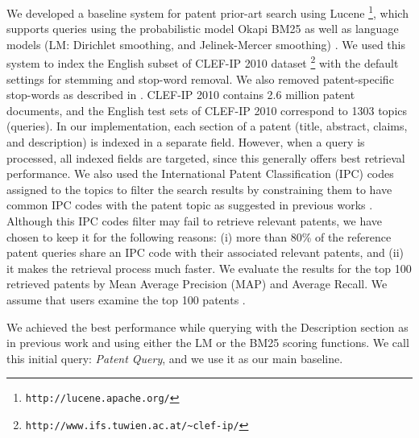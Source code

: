 We developed a baseline system for patent prior-art search using
Lucene%
\footnote{\texttt{http://lucene.apache.org/}%
}, which supports queries using the probabilistic
model Okapi BM25 \cite{Robertson1993} as well as language models (LM: Dirichlet
smoothing, and Jelinek-Mercer smoothing) \cite{Zhai2001}. We used
this system to index the English subset of CLEF-IP 2010 dataset%
\footnote{\texttt{http://www.ifs.tuwien.ac.at/\textasciitilde{}clef-ip/}%
} with the default settings for stemming and stop-word removal. 
We
also removed patent-specific stop-words as described in \cite{magdy2012toward}.
CLEF-IP 2010 contains 2.6 million patent documents, and the English
test sets of CLEF-IP 2010 correspond to 1303 topics (queries). In
our implementation, each section of a patent (title, abstract, claims,
and description) is indexed in a separate field. However, when a query
is processed, all indexed fields are targeted, since this generally
offers best retrieval performance. We also used the International
Patent Classification (IPC) codes assigned to the topics to filter
the search results by constraining them to have common IPC codes with
the patent topic as suggested in previous works \cite{lopez2010patatras}.
Although this IPC codes filter may fail to retrieve relevant patents, we
have chosen to keep it for the following reasons: (i) more than 80\%
of the reference patent queries share an IPC code with their associated relevant
patents, and (ii) it makes the retrieval process much faster. We evaluate
the results for the top 100 retrieved patents by Mean Average Precision
(MAP) and Average Recall. We assume that users examine the top 100
patents \cite{joho2010survey}.

We achieved the best performance while querying with the Description
section as in previous work \cite{xue2009transforming} and using
either the LM or the BM25 scoring functions. We call this initial
query: \emph{Patent Query}, and we use it as our main baseline.
